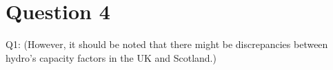 \section{Question 4}

Q1: (However, it should be noted that there might be discrepancies between hydro's capacity factors in the UK and Scotland.)